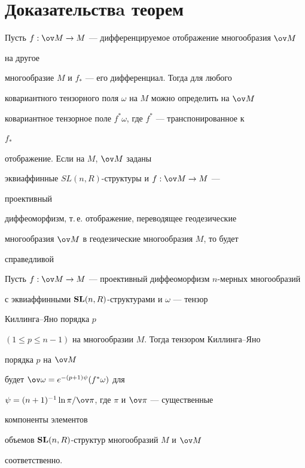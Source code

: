  


 


\section{Доказательствa теорем} 


 


 


Пусть $f:\ov M\to M$ --- дифференцируемое отображение многообразия $\ov M$ 


на другое 


многообразие $M$ и $f_*$ --- его дифференциал. Тогда для любого 


ковариантного тензорного поля $\omega$ на $M$ можно определить на $\ov M$ 


ковариантное тензорное поле $f^*\omega$, где $f^*$ --- транспонированное к 


$f_*$ 


отображение. Если на $M$, $\ov M$ заданы


эквиаффинные $SL(n,R)$-структуры и $f:\ov M\to M$ --- 


проективный 


диффеоморфизм, т.\,е. отображение, переводящее геодезические 


многообразия $\ov M$ в геодезические многообразия $M$, то будет 


справедливой 


 


 


\begin{lem} 


Пусть $f:\ov M\to M$ --- проективный диффеоморфизм $n$-мерных многообразий 


с эквиаффинными $\bold {SL}(n,R)$-структурами и $\omega$ --- тензор 


Киллинга--Яно порядка $p$ 


$(1\le p\le n-1)$ на многообразии $M$. Тогда тензором Киллинга--Яно 


порядка $p$ на $\ov M$ 


будет $\ov\omega=e^{-(p+1)\psi}(f^*\omega)$ для 


$\psi=(n+1)^{-1}\ln\pi/\ov\pi$, где $\pi$ и $\ov \pi$ --- существенные 


компоненты элементов 


объемов $\bold {SL}(n,R)$-структур многообразий $M$ и $\ov M$ 


соответственно. 


\end{lem} 


